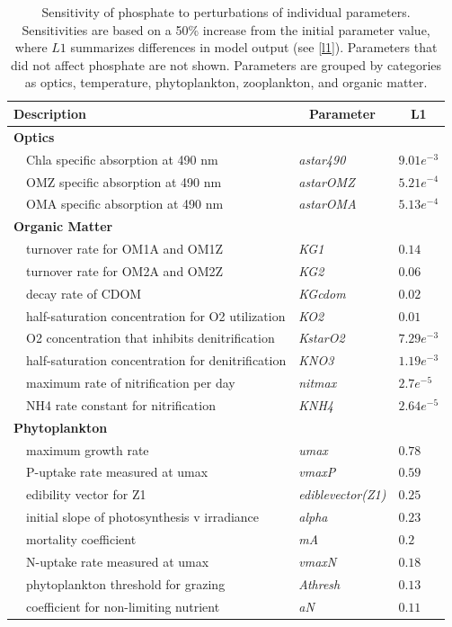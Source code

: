 \documentclass[review]{elsarticle}\usepackage[]{graphicx}\usepackage[]{color}
\begin{document}
\begin{table}[!tbp]
{\footnotesize
\caption{Sensitivity of phosphate to perturbations of individual parameters.  Sensitivities are based on a 50\% increase from the initial parameter value, where $L1$ summarizes differences in model output (see \cref{l1}).  Parameters that did not affect phosphate are not shown.  Parameters are grouped by categories as optics, temperature, phytoplankton, zooplankton, and organic matter.\label{tab:po4sens}} 
\begin{center}
\begin{tabular}{lll}
\hline\hline
\multicolumn{1}{l}{Description}&\multicolumn{1}{c}{Parameter}&\multicolumn{1}{c}{L1}\tabularnewline
\hline
{\bfseries Optics}&&\tabularnewline
~~Chla specific absorption at 490 nm&\textit{astar490}&$9.01e^{-3}$\tabularnewline
~~OMZ specific absorption at 490 nm&\textit{astarOMZ}&$5.21e^{-4}$\tabularnewline
~~OMA specific absorption at 490 nm&\textit{astarOMA}&$5.13e^{-4}$\tabularnewline
\hline
{\bfseries Organic Matter}&&\tabularnewline
~~turnover rate for OM1A and OM1Z&\textit{KG1}&$0.14$\tabularnewline
~~turnover rate for OM2A and OM2Z&\textit{KG2}&$0.06$\tabularnewline
~~decay rate of CDOM&\textit{KGcdom}&$0.02$\tabularnewline
~~half-saturation concentration for O2 utilization&\textit{KO2}&$0.01$\tabularnewline
~~O2 concentration that inhibits denitrification&\textit{KstarO2}&$7.29e^{-3}$\tabularnewline
~~half-saturation concentration for denitrification&\textit{KNO3}&$1.19e^{-3}$\tabularnewline
~~maximum rate of nitrification per day&\textit{nitmax}&$2.7e^{-5}$\tabularnewline
~~NH4 rate constant for nitrification&\textit{KNH4}&$2.64e^{-5}$\tabularnewline
\hline
{\bfseries Phytoplankton}&&\tabularnewline
~~maximum growth rate&\textit{umax}&$0.78$\tabularnewline
~~P-uptake rate measured at umax&\textit{vmaxP}&$0.59$\tabularnewline
~~edibility vector for Z1&\textit{ediblevector(Z1)}&$0.25$\tabularnewline
~~initial slope of photosynthesis v irradiance&\textit{alpha}&$0.23$\tabularnewline
~~mortality coefficient&\textit{mA}&$0.2$\tabularnewline
~~N-uptake rate measured at umax&\textit{vmaxN}&$0.18$\tabularnewline
~~phytoplankton threshold for grazing&\textit{Athresh}&$0.13$\tabularnewline
~~coefficient for non-limiting nutrient&\textit{aN}&$0.11$\tabularnewline

\end{tabular}
\end{center}}
\end{table}
\end{document}
